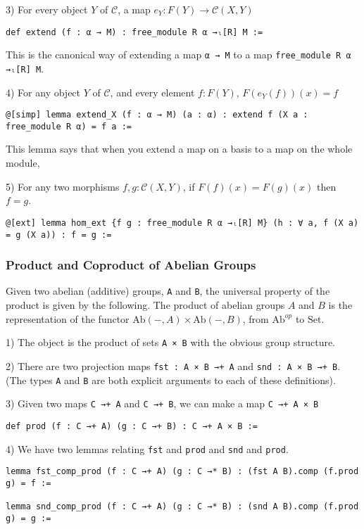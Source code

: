 \documentclass[12pt]{article} %
\theoremstyle{definition}
\theoremstyle{definition}
\theoremstyle{definition}
\theoremstyle{definition}
\begin{document}
3) For every object $Y$ of $\mathcal{C}$, a map $e_Y : F(Y) \to \mathcal{C}(X, Y)$
\begin{lstlisting}
def extend (f : α → M) : free_module R α →ₗ[R] M :=
\end{lstlisting}
This is the canonical way of extending a map \lstinline{α → M} to a map 
\lstinline{free_module R α →ₗ[R] M}.

4) For any object $Y$ of $\mathcal{C}$, and every element $f : F(Y)$, $F(e_Y(f))(x) = f$
\begin{lstlisting}
@[simp] lemma extend_X (f : α → M) (a : α) : extend f (X a : free_module R α) = f a :=
\end{lstlisting}
This lemma says that when you extend a map on a basis to a map on the whole module,

5) For any two morphisms $f, g : \mathcal{C}(X, Y)$, if $F(f)(x) = F(g)(x)$ then $f = g$.
\begin{lstlisting}
@[ext] lemma hom_ext {f g : free_module R α →ₗ[R] M} (h : ∀ a, f (X a) = g (X a)) : f = g :=
\end{lstlisting}

\subsubsection{Product and Coproduct of Abelian Groups}

Given two abelian (additive) groups, \lstinline{A} and \lstinline {B}, 
the universal property of the product is given by the following.
The product of abelian groups $A$ and $B$ is the representation
of the functor $\text{Ab}(-, A) \times \text{Ab}(-, B)$, from
$\text{Ab}^{op}$ to $\text{Set}$.

1) The object is the product of sets \lstinline{A × B} with the obvious
group structure.

2) There are two projection maps \lstinline{fst : A × B →+ A} and 
\lstinline{snd : A × B →+ B}. (The types \lstinline{A} and \lstinline{B}
are both explicit arguments to each of these definitions).

3) Given two maps \lstinline{C →+ A} and \lstinline{C →+ B}, we can make a map
\lstinline{C →+ A × B}
\begin{lstlisting}
def prod (f : C →+ A) (g : C →+ B) : C →+ A × B :=
\end{lstlisting}

4) We have two lemmas relating \lstinline{fst} and \lstinline{prod} and \lstinline{snd}
and \lstinline{prod}.
\begin{lstlisting}
lemma fst_comp_prod (f : C →+ A) (g : C →* B) : (fst A B).comp (f.prod g) = f :=
  
lemma snd_comp_prod (f : C →+ A) (g : C →* B) : (snd A B).comp (f.prod g) = g :=
\end{lstlisting}
\end{document}
